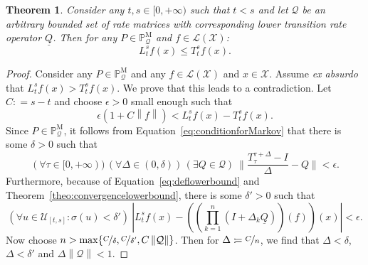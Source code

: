 \documentclass[10pt]{paper}
\newtheorem{theorem}{Theorem}
\newcommand{\states}{\mathcal{X}}
\newcommand{\processes}{\mathbb{P}}
\newcommand{\mprocesses}{\processes^{\mathrm{M}}}
\newcommand{\lbound}{L}
\newcommand{\gambles}{\mathcal{L}}
\newcommand{\gamblesX}{\gambles(\states)}
\newcommand{\rateset}{\mathcal{Q}}
\newcommand{\lrate}{\underline{Q}}
\newcommand{\norm}[1]{\left\lVert #1 \right\rVert}
\newcommand{\abs}[1]{\left\vert #1 \right\vert}
\newcommand{\coloneqq}{:\!=}
\begin{document}
\begin{theorem}
Consider any $t,s\in[0,+\infty)$ such that $t<s$ and let $\rateset$ be an arbitrary bounded set of rate matrices with corresponding lower transition rate operator $\lrate$. Then for any $P\in\mprocesses_\rateset$ and $f\in\gamblesX$:
\begin{equation*}
\lbound_t^sf(x)\leq T_t^sf(x).
\end{equation*}
\end{theorem}
\begin{proof}
Consider any $P\in\mprocesses_\rateset$ and any $f\in\gamblesX$ and $x\in\states$. Assume \emph{ex absurdo} that $\lbound_t^sf(x)>T_t^sf(x)$. We prove that this leads to a contradiction.  Let $C\coloneqq s-t$ and choose $\epsilon>0$ small enough such that
\begin{equation}\label{eq:chooseepsilon}
\epsilon(1+C\norm{f})<\lbound_t^sf(x)-T_t^sf(x).
\end{equation}
Since $P\in\mprocesses_\rateset$, it follows from Equation~\eqref{eq:conditionforMarkov} that there is some $\delta>0$ such that
\begin{equation}\label{eq:1conditionforMarkov}
(\forall \tau\in[0,+\infty))\,
(\forall\Delta\in(0,\delta))\,
(\exists Q\in\rateset)~
\Big\lVert\frac{T_\tau^{\tau+\Delta}-I}{\Delta}-Q\Big\rVert<\epsilon.
\end{equation}
Furthermore, because of Equation~\eqref{eq:deflowerbound} and Theorem~\ref{theo:convergencelowerbound}, there is some $\delta'>0$ such that
\begin{equation}\label{eq:deltaprimeformula}
(\forall u\in\mathcal{U}_{[t,s]}\colon\sigma(u)<\delta')~\abs{\lbound_t^sf(x) - \left(\left(\prod_{k=1}^n(I+\Delta_k\lrate)\right)(f)\right)(x)}<\epsilon.
\end{equation}
Now choose $n>\max\{\nicefrac{C}{\delta},\nicefrac{C}{\delta'},C\norm{\rateset}\}$. Then for $\Delta\coloneqq\nicefrac{C}{n}$, we find that $\Delta<\delta$, $\Delta<\delta'$ and $\Delta\norm{\rateset}<1$. 


\end{proof}
\end{document}
